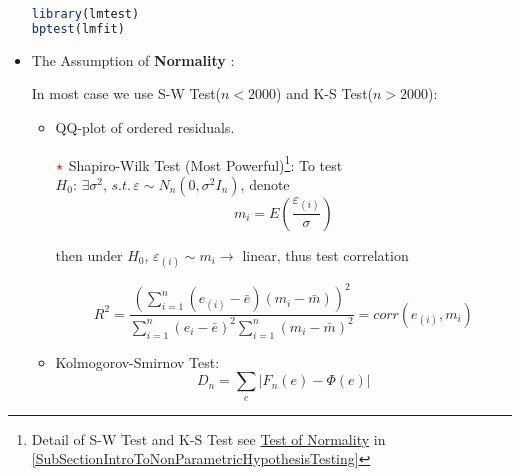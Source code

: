 \begin{itemize}[topsep=2pt,itemsep=2pt]
\begin{rcode}
\begin{lstlisting}[language=R]
library(lmtest)
bptest(lmfit)
\end{lstlisting}

\end{rcode}

    \item The Assumption of \textbf{Normality} :
    
    In most case we use S-W Test($ n<2000 $) and K-S Test($ n>2000 $):
    \begin{itemize}[topsep=2pt,itemsep=2pt]
        \item QQ-plot of ordered residuals.
        
        \item[$ {\color{red}\star}  $] Shapiro-Wilk Test (Most Powerful)\footnote{Detail of S-W Test and K-S Test see \hyperlink{testofnormality}{Test of Normality} in \autoref{SubSectionIntroToNonParametricHypothesisTesting}}: To test $ H_0: \,\exists \sigma ^2, \,s.t. \,\varepsilon \sim N_n(0,\sigma ^2I_n)  $, denote 
        \begin{equation}
            m_i=E(\dfrac{\varepsilon _{(i)} }{\sigma }) 
        \end{equation}

        then under $H_0 $, $ \varepsilon _{(i)}\sim m_i \to $ linear, thus test correlation 
        
        \begin{equation}
            R^2=\dfrac{\left(\sum_{i=1}^n(e_{(i)}-\bar{e})(m_i-\bar{m})\right)^2}{\sum_{i=1}^n(e_{i}-\bar{e})^2\sum_{i=1}^n(m_i-\bar{m})^2}=corr(e_{(i)},m_i) 
        \end{equation}
        
        \item Kolmogorov-Smirnov Test: 
        \begin{equation}
            D_n=\sum_{e}|F_n(e)-\Phi(e)|
        \end{equation}
        

\end{itemize}
\end{itemize}
